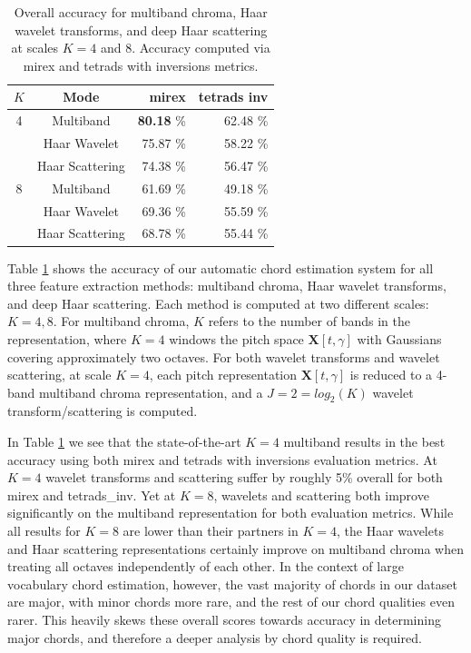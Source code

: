 \documentclass{article}
\begin{document}
\begin{table}
	\begin{center}
	\begin{tabular} {| c | c | r  | r |}
	\hline
	$K$ & Mode & mirex & tetrads inv \\
	\hline
	4 & Multiband & \textbf{80.18} \% & 62.48 \% \\
	& Haar Wavelet & 75.87 \%  & 58.22 \%\\
	& Haar Scattering & 74.38 \%  & 56.47 \% \\
	\hline
	8 & Multiband & 61.69 \% & 49.18 \% \\
	& Haar Wavelet & 69.36 \% & 55.59 \% \\
	& Haar Scattering & 68.78 \% & 55.44 \% \\
	\hline
	\end{tabular}
	\end{center}
	\protect\caption{Overall accuracy for multiband chroma, Haar wavelet transforms, and deep Haar scattering at scales $K=4$ and $8$. Accuracy computed via mirex and tetrads with inversions metrics.
	\label{table:overall-scores}}
\end{table}

Table \ref{table:overall-scores} shows the accuracy of our automatic chord estimation system for all three feature extraction methods: multiband chroma, Haar wavelet transforms, and deep Haar scattering. Each method is computed at two different scales: $K=4,8$. For multiband chroma, $K$ refers to the number of bands in the representation, where $K=4$ windows the pitch space $\mathbf{X}[t, \gamma]$ with Gaussians covering approximately two octaves. For both wavelet transforms and wavelet scattering, at scale $K=4$, each pitch representation $\mathbf{X}[t,\gamma]$ is reduced to a 4-band multiband chroma representation, and a $J=2=log_2(K)$ wavelet transform/scattering is computed. 

In Table \ref{table:overall-scores} we see that the state-of-the-art $K=4$ multiband results in the best accuracy using both mirex and tetrads with inversions evaluation metrics. At $K=4$ wavelet transforms and scattering suffer by roughly 5\% overall for both mirex and tetrads\_inv. Yet at $K=8$, wavelets and scattering both improve significantly on the multiband representation for both evaluation metrics. While all results for $K=8$ are lower than their partners in $K=4$, the Haar wavelets and Haar scattering representations certainly improve on multiband chroma when treating all octaves independently of each other. In the context of large vocabulary chord estimation, however, the vast majority of chords in our dataset are major, with minor chords more rare, and the rest of our chord qualities even rarer. This heavily skews these overall scores towards accuracy in determining major chords, and therefore a deeper analysis by chord quality is required.
\end{document}
